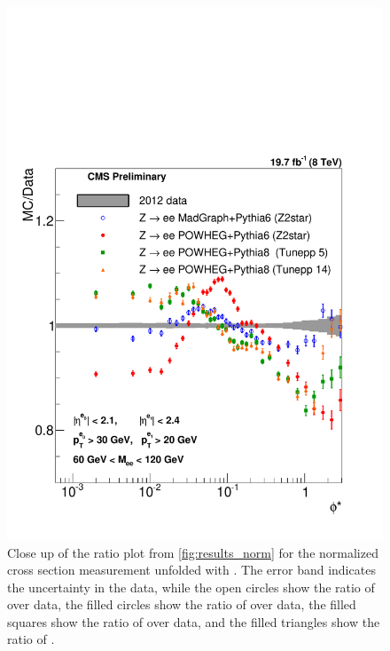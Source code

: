 \begin{figure}[!p]
    \centering
    \includegraphics[width=\textwidth]{figures/ZShape_Ratioelec_Norm_Dressed.pdf}
    \caption[
        Close up of the ratio plot from \cref{fig:results_norm} for the
        normalized cross section measurement unfolded with \MADGRAPH.
    ]{
        Close up of the ratio plot from \cref{fig:results_norm} for the
        normalized cross section measurement unfolded with \MADGRAPH. The error
        band indicates the uncertainty in the data, while the open circles show
        the ratio of \MADGRAPH over data, the filled circles show the ratio of
        \PPsixZtwo over data, the filled squares show the ratio of
        \PPeightTTfive over data, and the filled triangles show the ratio of
        \PPeightTTfourteen.
    }
    \label{fig:results_ratio_norm}
\end{figure}
